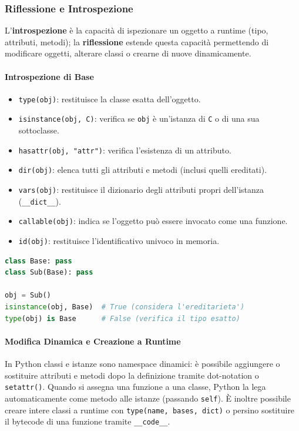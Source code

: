 \documentclass[12pt]{extarticle}
\begin{document}
\subsubsection{Riflessione e Introspezione}

L'\textbf{introspezione} è la capacità di ispezionare un oggetto a runtime (tipo, attributi, metodi); la \textbf{riflessione} estende questa capacità permettendo di modificare oggetti, alterare classi o crearne di nuove dinamicamente.

\paragraph{Introspezione di Base}
\begin{itemize}
\item \texttt{type(obj)}: restituisce la classe esatta dell'oggetto.
\item \texttt{isinstance(obj, C)}: verifica se \texttt{obj} è un'istanza di \texttt{C} o di una sua sottoclasse.
\item \texttt{hasattr(obj, "attr")}: verifica l'esistenza di un attributo.
\item \texttt{dir(obj)}: elenca tutti gli attributi e metodi (inclusi quelli ereditati).
\item \texttt{vars(obj)}: restituisce il dizionario degli attributi propri dell'istanza (\texttt{\_\_dict\_\_}).
\item \texttt{callable(obj)}: indica se l'oggetto può essere invocato come una funzione.
\item \texttt{id(obj)}: restituisce l'identificativo univoco in memoria.
\end{itemize}

\begin{lstlisting}[language=Python]
class Base: pass
class Sub(Base): pass

obj = Sub()
isinstance(obj, Base)  # True (considera l'ereditarieta')
type(obj) is Base      # False (verifica il tipo esatto)
\end{lstlisting}

\paragraph{Modifica Dinamica e Creazione a Runtime}
In Python classi e istanze sono namespace dinamici: è possibile aggiungere o sostituire attributi e metodi dopo la definizione tramite dot-notation o \texttt{setattr()}. Quando si assegna una funzione a una classe, Python la lega automaticamente come metodo alle istanze (passando \texttt{self}). È inoltre possibile creare intere classi a runtime con \texttt{type(name, bases, dict)} o persino sostituire il bytecode di una funzione tramite \texttt{\_\_code\_\_}.
\end{document}
